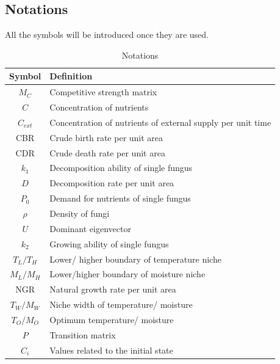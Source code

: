 \documentclass[12pt]{article}
\begin{document}
\subsection{Notations}
All the symbols will be introduced once they are used.
\begin{table}[H]
	\begin{center}
		\caption{Notations}
		\begin{tabular}{cl}
			\toprule
			\multicolumn{1}{m{3cm}}{\centering Symbol}
			&\multicolumn{1}{m{8cm}}{\centering Definition}\\
			\midrule
			$M_{C}$&Competitive strength matrix\\
			$C$&Concentration of nutrients\\
			$C_{ext}$&Concentration of nutrients of external supply per unit time\\
			CBR&Crude birth rate per unit area\\
			CDR&Crude death rate per unit area\\
			$k_{1}$&Decomposition ability of single fungus\\
			$D$&Decomposition rate per unit area\\
			$P_{0}$&Demand for nutrients of single fungus\\
			$\rho$&Density of fungi\\
			$U$&Dominant eigenvector\\
			$k_{2}$&Growing ability of single fungus\\
			$T_{L}/T_{H}$&Lower/ higher boundary of temperature niche \\
			$M_{L}/M_{H}$&Lower/higher boundary of moisture niche\\
			NGR&Natural growth rate per unit area\\
			$T_{W}/M_{W}$&Niche width of temperature/ moisture\\
			$T_{O}/M_{O}$&Optimum temperature/ moisture\\
			$P$&Transition matrix\\
			$C_{i}$&Values related to the initial state\\
			
			\bottomrule
		\end{tabular}\label{Ntt}
	\end{center}
\end{table}
\end{document}
